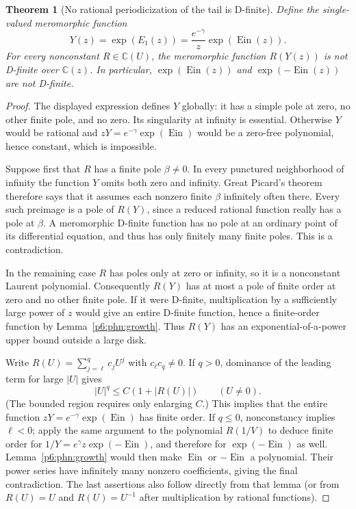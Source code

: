 \documentclass[11pt,a4paper]{article}
\newtheorem{theorem}{Theorem}[section]
\theoremstyle{definition}
\theoremstyle{remark}
\numberwithin{equation}{section}
\begin{document}
\begin{theorem}[No rational periodicization of the tail is D-finite]
\label{p6:phn:periodicization}
Define the single-valued meromorphic function
\[
 Y(z)=\exp(E_1(z))=\frac{e^{-\gamma}}z
                               \exp(\operatorname{Ein}(z)).
\]
For every nonconstant $R\in\mathbb C(U)$, the meromorphic function
$R(Y(z))$ is not D-finite over $\mathbb C(z)$.
In particular, $\exp(\operatorname{Ein}(z))$ and
$\exp(-\operatorname{Ein}(z))$ are not D-finite.
\end{theorem}
\begin{proof}
The displayed expression defines $Y$ globally: it has a simple
pole at zero, no other finite pole, and no zero.  Its singularity
at infinity is essential.  Otherwise $Y$ would be rational and
$zY=e^{-\gamma}\exp(\operatorname{Ein})$ would be a zero-free
polynomial, hence constant, which is impossible.

Suppose first that $R$ has a finite pole $\beta\ne0$.  In every
punctured neighborhood of infinity the function $Y$ omits both
zero and infinity.  Great Picard's theorem therefore says that
it assumes each nonzero finite $\beta$ infinitely often there.
Every such preimage is a pole of $R(Y)$, since a reduced rational
function really has a pole at $\beta$.  A meromorphic D-finite
function has no pole at an ordinary point of its differential
equation, and thus has only finitely many finite poles.  This is a
contradiction.

In the remaining case $R$ has poles only at zero or infinity,
so it is a nonconstant Laurent polynomial.  Consequently $R(Y)$
has at most a pole of finite order at zero and no other finite
pole.  If it were D-finite, multiplication by a sufficiently large
power of $z$ would give an entire D-finite function, hence a
finite-order function by Lemma~\ref{p6:phn:growth}.  Thus $R(Y)$
has an exponential-of-a-power upper bound outside a large disk.

Write $R(U)=\sum_{j=\ell}^q c_jU^j$ with $c_\ell c_q\ne0$.
If $q>0$, dominance of the leading term for large $|U|$ gives
\[
 |U|^q\leq C(1+|R(U)|) \qquad(U\ne0).
\]
(The bounded region requires only enlarging $C$.)  This implies
that the entire function $zY=e^{-\gamma}\exp(\operatorname{Ein})$
has finite order.  If $q\leq0$, nonconstancy implies $\ell<0$;
apply the same argument to the polynomial $R(1/V)$ to deduce
finite order for $1/Y=e^\gamma z\exp(-\operatorname{Ein})$,
and therefore for $\exp(-\operatorname{Ein})$ as well.
Lemma~\ref{p6:phn:growth} would then make $\operatorname{Ein}$ or
$-\operatorname{Ein}$ a polynomial.  Their power series have
infinitely many nonzero coefficients, giving the final contradiction.
The last assertions also follow directly from that lemma (or from
$R(U)=U$ and $R(U)=U^{-1}$ after multiplication by rational
functions).
\end{proof}
\end{document}
